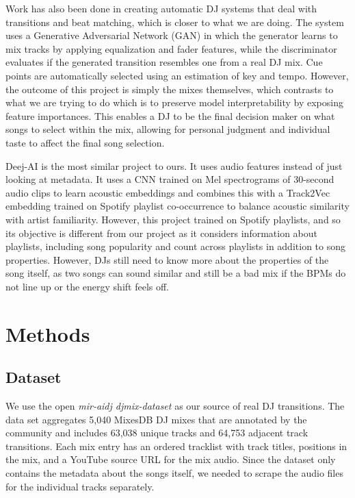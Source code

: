 \documentclass{article}
\begin{document}
Work has also been done in creating automatic DJ systems \citep{arxiv2021autodj} that deal with transitions and beat matching, which is closer to what we are doing. The system uses a Generative Adversarial Network (GAN) in which the generator learns to mix tracks by applying equalization and fader features, while the discriminator evaluates if the generated transition resembles one from a real DJ mix. Cue points are automatically selected using an estimation of key and tempo. However, the outcome of this project is simply the mixes themselves, which contrasts to what we are trying to do which is to preserve model interpretability by exposing feature importances. This enables a DJ to be the final decision maker on what songs to select within the mix, allowing for personal judgment and individual taste to affect the final song selection.

Deej-AI \citep{teticio_deejai} is the most similar project to ours. It uses audio features instead of just looking at metadata. It uses a CNN trained on Mel spectrograms of 30-second audio clips to learn acoustic embeddings and combines this with a Track2Vec embedding trained on Spotify playlist co-occurrence to balance acoustic similarity with artist familiarity. However, this project trained on Spotify playlists, and so its objective is different from our project as it considers information about playlists, including song popularity and count across playlists in addition to song properties. However, DJs still need to know more about the properties of the song itself, as two songs can sound similar and still be a bad mix if the BPMs do not line up or the energy shift feels off.

\section{Methods}

\subsection{Dataset}

We use the open \emph{mir-aidj djmix-dataset} \citep{mir_aidj_djmix} as our source of real DJ transitions. The data set aggregates 5{,}040 MixesDB DJ mixes that are annotated by the community and includes 63{,}038 unique tracks and 64{,}753 adjacent track transitions. Each mix entry has an ordered tracklist with track titles, positions in the mix, and a YouTube source URL for the mix audio. Since the dataset only contains the metadata about the songs itself, we needed to scrape the audio files for the individual tracks separately.
\end{document}
